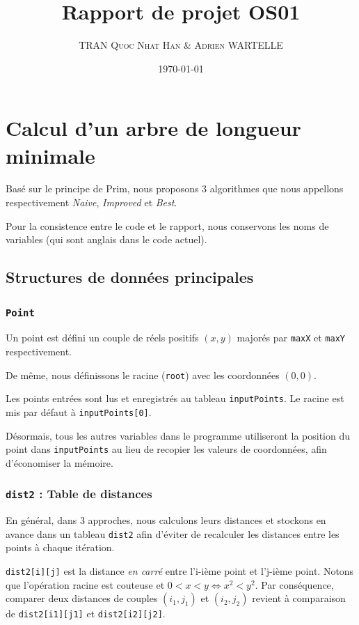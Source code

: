 \documentclass[10pt,a4paper]{article}
\author{\textsc{TRAN Quoc Nhat Han} \& \textsc{Adrien WARTELLE}}
\title{Rapport de projet OS01}
\date{\today}
\begin{document}
\maketitle
\renewcommand{\contentsname}{Sommaire}
\tableofcontents
\clearpage

\section{Calcul d'un arbre de longueur minimale}

Basé sur le principe de Prim, nous proposons 3 algorithmes que nous appellons respectivement \emph{Naive}, \emph{Improved} et \emph{Best}.

Pour la consistence entre le code et le rapport, nous conservons les noms de variables (qui sont anglais dans le code actuel).

\subsection{Structures de données principales}

\subsubsection{\texttt{Point}}

Un point est défini un couple de réels positifs $(x, y)$ majorés par \texttt{maxX} et \texttt{maxY} respectivement.

De même, nous définissons le racine (\texttt{root}) avec les coordonnées $(0, 0)$.

Les points entrées sont lus et enregistrés au tableau \texttt{inputPoints}. Le racine est mis par défaut à \texttt{inputPoints[0]}.

Désormais, tous les autres variables dans le programme utiliseront la position du point dans \texttt{inputPoints} au lieu de recopier les valeurs de coordonnées, afin d'économiser la mémoire.

\subsubsection{\texttt{dist2} : Table de distances}

En général, dans 3 approches, nous calculons leurs distances et stockons en avance dans un tableau \texttt{dist2} afin d'éviter de recalculer les distances entre les points à chaque itération.

\texttt{dist2[i][j]} est la distance \emph{en carré} entre l'i-ième point et l'j-ième point. Notons que l'opération racine est couteuse et $0<x<y \Leftrightarrow x^2 < y^2$. Par conséquence, comparer deux distances de couples $(i_1, j_1)$ et $(i_2, j_2)$ revient à comparaison de \texttt{dist2[i1][j1]} et \texttt{dist2[i2][j2]}.
\end{document}
